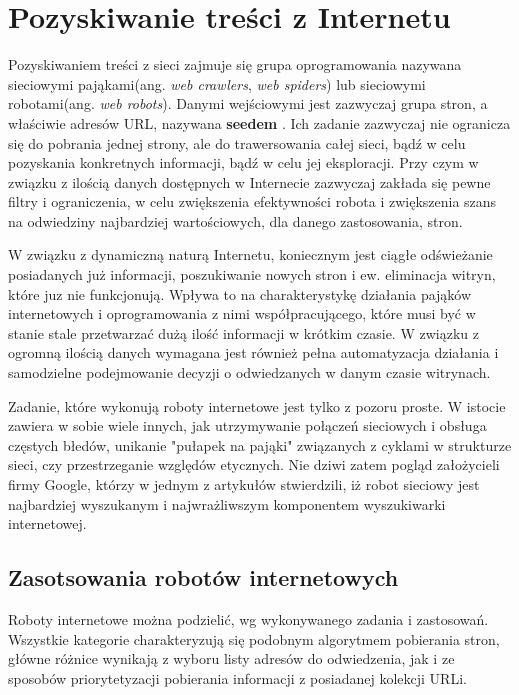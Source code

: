 \chapter{Pozyskiwanie treści z Internetu}
\label{cha:pozyskiwanieTresci}

Pozyskiwaniem treści z sieci zajmuje się grupa oprogramowania nazywana sieciowymi pająkami(ang. \emph{web crawlers}, \emph{web spiders}) lub sieciowymi robotami(ang. \emph{web robots}). Danymi wejściowymi jest zazwyczaj grupa stron, a właściwie adresów URL, nazywana \textbf{seedem} \cite{webCrawling}. Ich zadanie zazwyczaj nie ogranicza się do pobrania jednej strony, ale do trawersowania całej sieci, bądź w celu pozyskania konkretnych informacji, bądź w celu jej eksploracji. Przy czym w związku z ilością danych dostępnych w Internecie zazwyczaj zakłada się pewne filtry i ograniczenia, w celu zwiększenia efektywności robota i zwiększenia szans na odwiedziny najbardziej wartościowych, dla danego zastosowania, stron.

W związku z dynamiczną naturą Internetu, koniecznym jest ciągłe odświeżanie posiadanych już informacji, poszukiwanie nowych stron i ew. eliminacja witryn, które juz nie funkcjonują. Wpływa to na charakterystykę działania pająków internetowych i oprogramowania z nimi współpracującego, które musi być w stanie stale przetwarzać dużą ilość informacji w krótkim czasie. W związku z ogromną ilością danych wymagana jest również pełna automatyzacja działania i samodzielne podejmowanie decyzji o odwiedzanych w danym czasie witrynach.

Zadanie, które wykonują roboty internetowe jest tylko z pozoru proste. W istocie zawiera w sobie wiele innych, jak utrzymywanie połączeń sieciowych i obsługa częstych błedów, unikanie "pułapek na pająki" związanych z cyklami w strukturze sieci, czy przestrzeganie względów etycznych. Nie dziwi zatem pogląd założycieli firmy Google, którzy w jednym z artykułów stwierdzili, iż robot sieciowy jest najbardziej wyszukanym i najwrażliwszym komponentem wyszukiwarki internetowej\cite{BrinLawrence}.


\section{Zasotsowania robotów internetowych}
\label{sec:podzialRobotow}
Roboty internetowe można podzielić, wg wykonywanego zadania i zastosowań. Wszystkie kategorie charakteryzują się podobnym algorytmem pobierania stron, główne różnice wynikają z wyboru listy adresów do odwiedzenia, jak i ze sposobów priorytetyzacji pobierania informacji z posiadanej kolekcji URLi.

